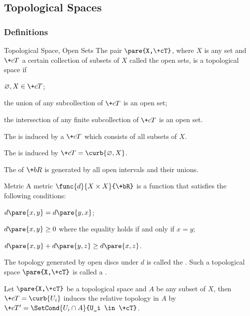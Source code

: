 \documentclass[hidelinks]{article}
\begin{document}


\subsection{Topological Spaces} %
\label{sub:topological_spaces}

\subsubsection{Definitions} %
\label{ssub:definitions}

\begin{termdef}{Topological Space, Open Sets}
    The pair $\pare{X,\+cT}$, where $X$ is any set and $\+cT$ a certain collection of subsets of $X$ called the open sets, is a topological space if
    \begin{citemize}
        \item $\varnothing, X\in \+cT$;
        \item the union of any subcollection of $\+cT$ is an open set;
        \item the intersection of any finite subcollection of $\+cT$ is an open set.
    \end{citemize}
\end{termdef}
The  is induced by a $\+cT$ which consists of all subsets of $X$.
\par
The  is induced by $\+cT = \curb{\varnothing,X}$.
\par
The  of $\+bR$ is generated by all open intervals and their unions.
\begin{termdef}[\baselineskip]{Metric}
    A metric $\func{d}{X\times X}{\+bR}$ is a function that satisfies the following conditions:
    \begin{citemize}
        \item $d\pare{x,y} = d\pare{y,x}$;
        \item $d\pare{x,y} \ge 0$ where the equality holds if and only if $x=y$;
        \item $d\pare{x,y} + d\pare{y,z} \ge d\pare{x,z}$.
    \end{citemize}
\end{termdef}
The topology generated by open discs under $d$ is called the . Such a topological space $\pare{X,\+cT}$ is called a .
\par
Let $\pare{X,\+cT}$ be a topological space and $A$ be any subset of $X$, then $\+cT = \curb{U_i}$ induces the relative topology in $A$ by $\+cT' = \SetCond{U_i\cap A}{U_i \in \+cT}$.
\end{document}
